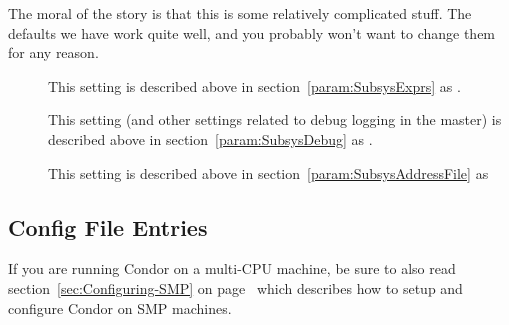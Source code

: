 The moral of the story is that this is some relatively complicated
stuff.  The defaults we have work quite well, and you probably 
won't want to change them for any reason.
\begin{description}

\item[] \label{param:MasterExprs} This setting is
  described above in section~\ref{param:SubsysExprs} as
  .

\item[] \label{param:MasterDebug} This setting
  (and other settings related to debug logging in the master) is
  described above in section~\ref{param:SubsysDebug} as
  .

\item[] \label{param:MasterAddressFile}
  This setting is described above in
  section~\ref{param:SubsysAddressFile} as

\end{description}

\subsection{\label{sec:Startd-Config-File-Entries}
 Config File Entries}

\Note If you are running Condor on a multi-CPU machine, be sure
to also read section~\ref{sec:Configuring-SMP} on
page~\pageref{sec:Configuring-SMP} which describes how to setup and
configure Condor on SMP machines.

